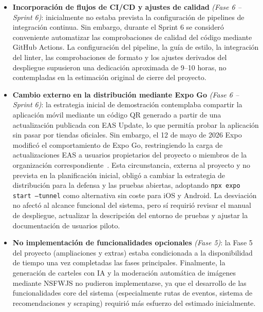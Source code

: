 \begin{itemize}
    \item \textbf{Incorporación de flujos de CI/CD y ajustes de calidad} \textit{(Fase 6 – Sprint 6)}: inicialmente no estaba prevista la configuración de pipelines de integración continua. Sin embargo, durante el Sprint 6 se consideró conveniente automatizar las comprobaciones de calidad del código mediante GitHub Actions. La configuración del pipeline, la guía de estilo, la integración del linter, las comprobaciones de formato y los ajustes derivados del despliegue supusieron una dedicación aproximada de 9--10 horas, no contempladas en la estimación original de cierre del proyecto.

    \item \textbf{Cambio externo en la distribución mediante Expo Go} \textit{(Fase 6 -- Sprint 6)}: la estrategia inicial de demostración contemplaba compartir la aplicación móvil mediante un código QR generado a partir de una actualización publicada con EAS Update, lo que permitía probar la aplicación sin pasar por tiendas oficiales. Sin embargo, el 12 de mayo de 2026 Expo modificó el comportamiento de Expo Go, restringiendo la carga de actualizaciones EAS a usuarios propietarios del proyecto o miembros de la organización correspondiente~\cite{expoGoLoading2026}. Esta circunstancia, externa al proyecto y no prevista en la planificación inicial, obligó a cambiar la estrategia de distribución para la defensa y las pruebas abiertas, adoptando \texttt{npx expo start --tunnel} como alternativa sin coste para iOS y Android. La desviación no afectó al alcance funcional del sistema, pero sí requirió revisar el manual de despliegue, actualizar la descripción del entorno de pruebas y ajustar la documentación de usuarios piloto.

    \item \textbf{No implementación de funcionalidades opcionales} \textit{(Fase 5)}: la Fase 5 del proyecto (ampliaciones y extras) estaba condicionada a la disponibilidad de tiempo una vez completadas las fases principales. Finalmente, la generación de carteles con IA y la moderación automática de imágenes mediante NSFWJS no pudieron implementarse, ya que el desarrollo de las funcionalidades core del sistema (especialmente rutas de eventos, sistema de recomendaciones y scraping) requirió más esfuerzo del estimado inicialmente.


\end{itemize}
